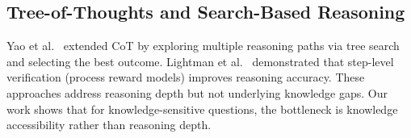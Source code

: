 \subsection{Tree-of-Thoughts and Search-Based Reasoning}
Yao et al.~\cite{yao2023tot} extended CoT by exploring multiple reasoning paths via tree search and selecting the best outcome. Lightman et al.~\cite{lightman2023verify} demonstrated that step-level verification (process reward models) improves reasoning accuracy. These approaches address reasoning depth but not underlying knowledge gaps. Our work shows that for knowledge-sensitive questions, the bottleneck is knowledge accessibility rather than reasoning depth.

